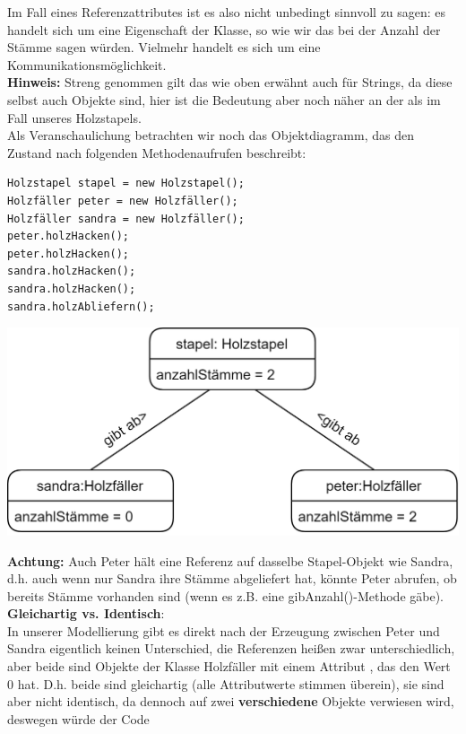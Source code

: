 \documentclass[fontsize=12pt]{article}
\begin{document}
Im Fall eines Referenzattributes ist es also nicht unbedingt sinnvoll zu sagen: es handelt sich um eine Eigenschaft der Klasse, so wie wir das bei der Anzahl der Stämme sagen würden. Vielmehr handelt es sich um eine Kommunikationsmöglichkeit. \\
\textbf{Hinweis:} Streng genommen gilt das wie oben erwähnt auch für Strings, da diese selbst auch Objekte sind, hier ist die Bedeutung aber noch näher an der  als im Fall unseres Holzstapels. \\
Als Veranschaulichung betrachten wir noch das Objektdiagramm, das den Zustand nach folgenden Methodenaufrufen beschreibt:
\begin{verbatim}
Holzstapel stapel = new Holzstapel();
Holzfäller peter = new Holzfäller();
Holzfäller sandra = new Holzfäller();
peter.holzHacken();
peter.holzHacken();
sandra.holzHacken();
sandra.holzHacken();
sandra.holzAbliefern();
\end{verbatim}
\begin{center}
    \includegraphics[scale=0.2]{media/obj_diagram_holz.png}
\end{center}
\textbf{Achtung:} Auch Peter hält eine Referenz auf dasselbe Stapel-Objekt wie Sandra, d.h. auch wenn nur Sandra ihre Stämme abgeliefert hat, könnte Peter abrufen, ob bereits Stämme vorhanden sind (wenn es z.B. eine gibAnzahl()-Methode gäbe). \vspace{2mm}\\
\textbf{Gleichartig vs. Identisch}: \\
In unserer Modellierung gibt es direkt nach der Erzeugung zwischen Peter und Sandra eigentlich keinen Unterschied, die Referenzen heißen zwar unterschiedlich, aber beide sind Objekte der Klasse Holzfäller mit einem Attribut , das den Wert $0$ hat. D.h. beide sind gleichartig (alle Attributwerte stimmen überein), sie sind aber nicht identisch, da dennoch auf zwei \textbf{verschiedene} Objekte verwiesen wird, deswegen würde der Code
\end{document}
